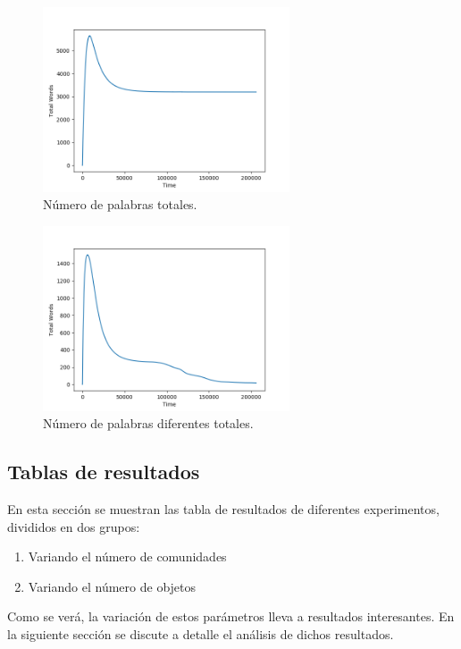 \documentclass[runningheads]{llncs}
\begin{document}
\begin{figure}[H]
	\centering
	\includegraphics[width=0.65\textwidth]{Figure_333_TotalWords.png}
	\caption{Número de palabras totales.}
	\label{fig_006}
\end{figure}
\begin{figure}[H]
	\centering
	\includegraphics[width=0.65\textwidth]{Figure_333_TotalDifferentWords.png}
	\caption{Número de palabras diferentes totales.}
	\label{fig_007}
\end{figure}

\subsection{Tablas de resultados}

En esta sección se muestran las tabla de resultados de diferentes experimentos, divididos en dos grupos:

\begin{enumerate}
	\item Variando el número de comunidades
	\item Variando el número de objetos
\end{enumerate}

Como se verá, la variación de estos parámetros lleva a resultados interesantes. En la siguiente sección se discute a detalle el análisis de dichos resultados.
\end{document}
